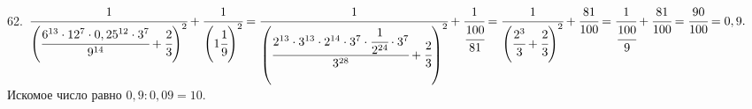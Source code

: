 62. $\cfrac{1}{\left(\cfrac{6^{13}\cdot12^7\cdot0,25^{12}\cdot3^7}{9^{14}}+\cfrac{2}{3}\right)^2}+\cfrac{1}{\left(1\cfrac{1}{9}\right)^2}=
\cfrac{1}{\left(\cfrac{2^{13}\cdot3^{13}\cdot2^{14}\cdot3^7\cdot\cfrac{1}{2^{24}}\cdot3^7}{3^{28}}+\cfrac{2}{3}\right)^2}+\cfrac{1}{\cfrac{100}{81}}=
\cfrac{1}{\left(\cfrac{2^3}{3}+\cfrac{2}{3}\right)^2}+\cfrac{81}{100}=
\cfrac{1}{\cfrac{100}{9}}+\cfrac{81}{100}=\cfrac{90}{100}=0,9.$
Искомое число равно $0,9:0,09=10.$\\
